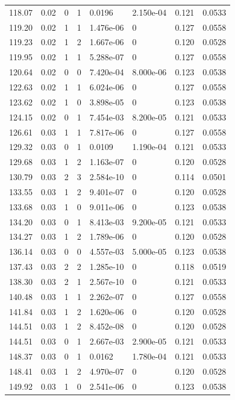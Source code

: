 \documentclass[preview]{standalone}
\begin{document}
{{{\begin{tabular}{L{1.2cm}C{1.2cm} C{0.3cm}C{0.5cm} C{1.4cm}C{1.4cm} C{1.4cm}C{1.4cm}}
  118.07  &  0.02  & 0     &  1 &  0.0196  & 2.150e-04  & 0.121 &  0.0533   \\ 
  119.20  &  0.02  & 1     &  1 &  1.476e-06  & 0  & 0.127 &  0.0558   \\ 
  119.23  &  0.02  & 1     &  2 &  1.667e-06  & 0  & 0.120 &  0.0528   \\ 
  119.95  &  0.02  & 1     &  1 &  5.288e-07  & 0  & 0.127 &  0.0558   \\ 
  120.64  &  0.02  & 0     &  0 &  7.420e-04  & 8.000e-06  & 0.123 &  0.0538   \\ 
  122.63  &  0.02  & 1     &  1 &  6.024e-06  & 0  & 0.127 &  0.0558   \\ 
  123.62  &  0.02  & 1     &  0 &  3.898e-05  & 0  & 0.123 &  0.0538   \\ 
  124.15  &  0.02  & 0     &  1 &  7.454e-03  & 8.200e-05  & 0.121 &  0.0533   \\ 
  126.61  &  0.03  & 1     &  1 &  7.817e-06  & 0  & 0.127 &  0.0558   \\ 
  129.32  &  0.03  & 0     &  1 &  0.0109  & 1.190e-04  & 0.121 &  0.0533   \\ 
  129.68  &  0.03  & 1     &  2 &  1.163e-07  & 0  & 0.120 &  0.0528   \\ 
  130.79  &  0.03  & 2     &  3 &  2.584e-10  & 0  & 0.114 &  0.0501   \\ 
  133.55  &  0.03  & 1     &  2 &  9.401e-07  & 0  & 0.120 &  0.0528   \\ 
  133.68  &  0.03  & 1     &  0 &  9.011e-06  & 0  & 0.123 &  0.0538   \\ 
  134.20  &  0.03  & 0     &  1 &  8.413e-03  & 9.200e-05  & 0.121 &  0.0533   \\ 
  134.27  &  0.03  & 1     &  2 &  1.789e-06  & 0  & 0.120 &  0.0528   \\ 
  136.14  &  0.03  & 0     &  0 &  4.557e-03  & 5.000e-05  & 0.123 &  0.0538   \\ 
  137.43  &  0.03  & 2     &  2 &  1.285e-10  & 0  & 0.118 &  0.0519   \\ 
  138.30  &  0.03  & 2     &  1 &  2.567e-10  & 0  & 0.121 &  0.0533   \\ 
  140.48  &  0.03  & 1     &  1 &  2.262e-07  & 0  & 0.127 &  0.0558   \\ 
  141.84  &  0.03  & 1     &  2 &  1.620e-06  & 0  & 0.120 &  0.0528   \\ 
  144.51  &  0.03  & 1     &  2 &  8.452e-08  & 0  & 0.120 &  0.0528   \\ 
  144.51  &  0.03  & 0     &  1 &  2.667e-03  & 2.900e-05  & 0.121 &  0.0533   \\ 
  148.37  &  0.03  & 0     &  1 &  0.0162  & 1.780e-04  & 0.121 &  0.0533   \\ 
  148.41  &  0.03  & 1     &  2 &  4.970e-07  & 0  & 0.120 &  0.0528   \\ 
  149.92  &  0.03  & 1     &  0 &  2.541e-06  & 0  & 0.123 &  0.0538   \\ 
\hline 
\end{tabular} 

}}}
\end{document}
